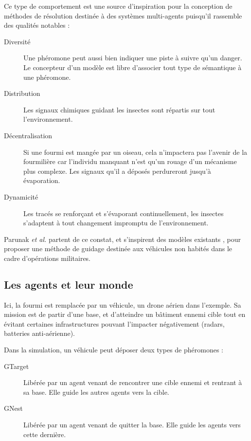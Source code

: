 \documentclass[12pt]{article}
\begin{document}
Ce type de comportement est une source d'inspiration pour la
conception de méthodes de résolution destinée à des systèmes
multi-agents puisqu'il rassemble des qualités notables \cite{parunak}
:

\begin{description}
\item[Diversité]{Une phéromone peut aussi bien indiquer une piste à
  suivre qu'un danger. Le concepteur d'un modèle est libre d'associer
  tout type de sémantique à une phéromone.}
\item[Distribution]{Les signaux chimiques guidant les insectes sont
  répartis sur tout l'environnement.}
\item[Décentralisation]{Si une fourmi est mangée par un oiseau, cela
  n'impactera pas l'avenir de la fourmilière car l'individu manquant
  n'est qu'un rouage d'un mécanisme plus complexe. Les signaux qu'il a
  déposés perdureront jusqu'à évaporation.}
\item[Dynamicité]{Les tracés se renforçant et s'évaporant
  continuellement, les insectes s'adaptent à tout changement impromptu
  de l'environnement.}
\end{description}

Parunak \textit{et al.} partent de ce constat, et s'inspirent des
modèles existants \cite{dorigo}, pour proposer une méthode de guidage
destinée aux véhicules non habités dans le cadre d'opérations
militaires.

\subsection{Les agents et leur monde}

Ici, la fourmi est remplacée par un véhicule, un drone aérien dans
l'exemple. Sa mission est de partir d'une base, et d'atteindre un
bâtiment ennemi cible tout en évitant certaines infrastructures
pouvant l'impacter négativement (radars, batteries anti-aérienne).

Dans la simulation, un véhicule peut déposer deux types de phéromones
:

\begin{description}
\item[GTarget]{Libérée par un agent venant de rencontrer une cible
  ennemi et rentrant à sa base. Elle guide les autres agents vers la
  cible.}
\item[GNest]{Libérée par un agent venant de quitter la base. Elle
  guide les agents vers cette dernière.}
\end{description}
\end{document}
